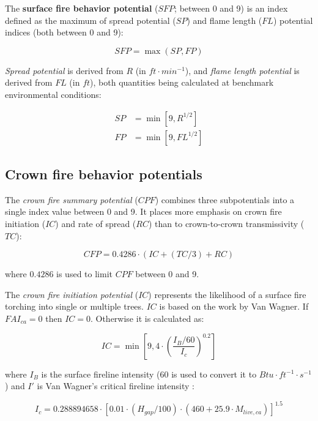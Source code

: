 \documentclass[]{book}
\begin{document}
The \textbf{surface fire behavior potential} (\(SFP\); between 0 and 9)
is an index defined as the maximum of spread potential (\(SP\)) and
flame length (\(FL\)) potential indices (both between 0 and 9):

\begin{equation}
SFP = \max(SP, FP)
\end{equation}

\emph{Spread potential} is derived from \(R\) (in \(ft\cdot min^{-1}\)),
and \emph{flame length potential} is derived from \(FL\) (in \(ft\)),
both quantities being calculated at benchmark environmental conditions:

\begin{eqnarray}
SP &= \min \left[ 9, R^{1/2}\right] \\
FP &= \min \left[ 9, FL^{1/2}\right] 
\end{eqnarray}

\subsection{Crown fire behavior
potentials}\label{crown-fire-behavior-potentials}

The \emph{crown fire summary potential} (\(CPF\)) combines three
subpotentials into a single index value between 0 and 9. It places more
emphasis on crown fire initiation (\(IC\)) and rate of spread (\(RC\))
than to crown-to-crown transmissivity (\(TC\)):

\begin{equation}
CFP = 0.4286 \cdot (IC+(TC/3)+RC)
\end{equation}

where \(0.4286\) is used to limit \(CPF\) between 0 and 9.

The \emph{crown fire initiation potential} (\(IC\)) represents the
likelihood of a surface fire torching into single or multiple trees.
\(IC\) is based on the work by Van Wagner. If \(FAI_{ca} = 0\) then
\(IC = 0\). Otherwise it is calculated as:

\begin{equation}
IC = \min \left[ 9, 4 \cdot \left(\frac{I_B/60}{I_c}\right)^{0.2}\right]
\end{equation}

where \(I_B\) is the surface fireline intensity (60 is used to convert
it to \(Btu\cdot ft^{-1} \cdot s^{-1}\)) and \(I'\) is Van Wagner's
critical fireline intensity \citep{Scott2002}:

\begin{equation}
I_c = 0.288894658 \cdot \left[ 0.01\cdot (H_{gap}/100) \cdot (460 +25.9\cdot M_{live, ca})\right]^{1.5}
\end{equation}
\end{document}
